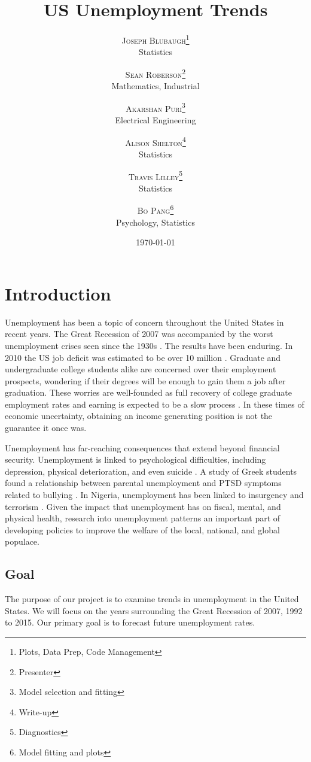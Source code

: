 \documentclass[twoside,twocolumn]{article}
\title{US Unemployment Trends} %
\author{%
\textsc{Joseph Blubaugh}\thanks{Plots, Data Prep, Code Management} \\[1ex] %
\normalsize Statistics\\ %
\and %
\textsc{Sean Roberson}\thanks{Presenter} \\[1ex] %
\normalsize Mathematics, Industrial\\ %
\and
\textsc{Akarshan Puri}\thanks{Model selection and fitting} \\[1ex]
\normalsize Electrical Engineering\\
\and
\textsc{Alison Shelton}\thanks{Write-up} \\[1ex]
\normalsize Statistics\\
\and
\textsc{Travis Lilley}\thanks{Diagnostics} \\[1ex]
\normalsize Statistics\\
\and
\textsc{Bo Pang}\thanks{Model fitting and plots} \\[1 ex]
\normalsize Psychology, Statistics
\vspace*{.5 cm}
}
\date{\today \vspace*{.25 cm}} %
\begin{document}
\maketitle



\section{Introduction}
		Unemployment has been a topic of concern throughout the United States in recent years.  The Great Recession of 2007 was accompanied by the worst unemployment crises seen since the 1930s \citep{wanberg2012individual}.   The results have been enduring. In 2010 the US job deficit was estimated to be over 10 million \citep{katz2010}. Graduate and undergraduate college students alike are concerned over their employment prospects, wondering if their degrees will be enough to gain them a job after graduation.  These worries are well-founded as full recovery of college graduate employment rates and earning is expected to be a slow process \citep{carnevale2015hard}.  In these times of economic uncertainty, obtaining an income generating position is not the guarantee it once was.

Unemployment has far-reaching consequences that extend beyond financial security. Unemployment is linked to psychological difficulties, including depression, physical deterioration, and even suicide  \citep{wanberg2012individual, insecure, suicide}. A study of Greek students found a relationship between parental unemployment and PTSD symptoms related to bullying \citep{kanellopoulos2014epa}. In Nigeria, unemployment has been linked to insurgency and terrorism \citep{terrorism}. Given the impact that unemployment has on fiscal, mental, and physical health, research into unemployment patterns 	 an important part of developing policies to improve the welfare of the local, national, and global populace.

\subsection{Goal}
		The purpose of our project is to examine trends in unemployment in the United States. We will focus on the years surrounding the Great Recession of 2007, 1992 to 2015.  Our primary goal is to forecast future unemployment rates.
\end{document}
